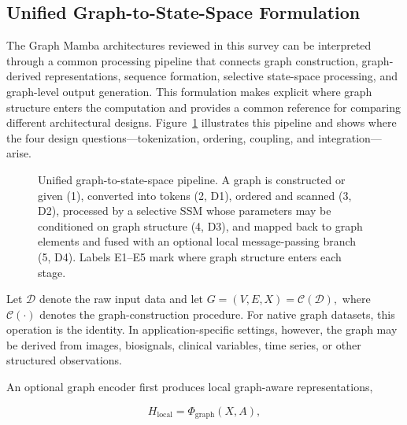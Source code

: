 \documentclass[acmsmall]{acmart}
\begin{document}

\subsection{Unified Graph-to-State-Space Formulation}
\label{sec:unified-framework}

The Graph Mamba architectures reviewed in this survey can be interpreted
through a common processing pipeline that connects graph construction,
graph-derived representations, sequence formation, selective state-space
processing, and graph-level output generation. This formulation makes explicit
where graph structure enters the computation and provides a common reference
for comparing different architectural designs.
Figure~\ref{fig:pipeline} illustrates this pipeline and shows where the four design questions—tokenization, ordering, coupling, and integration—arise.

\begin{figure}[h]
\centering

\resizebox{0.99\textwidth}{!}{%
    }
    \caption{Unified graph-to-state-space pipeline. A graph is constructed or given (1), converted into tokens (2, D1), ordered and scanned (3, D2), processed by a selective SSM whose parameters may be conditioned on graph structure (4, D3), and mapped back to graph elements and fused with an optional local message-passing branch (5, D4). Labels E1–E5 mark where graph structure enters each stage. }
\label{fig:pipeline}
\end{figure}



Let $\mathcal{D}$ denote the raw input data and let
$G=(V,E,X)=\mathcal{C}(\mathcal{D}),$
where $\mathcal{C}(\cdot)$ denotes the graph-construction procedure. For
native graph datasets, this operation is the identity. In application-specific
settings, however, the graph may be derived from images, biosignals, clinical
variables, time series, or other structured observations.

An optional graph encoder first produces local graph-aware representations,

\begin{equation}
H_{\mathrm{local}}
=
\Phi_{\mathrm{graph}}(X,A),
\label{eq:local-graph-representation}
\end{equation}
\end{document}
